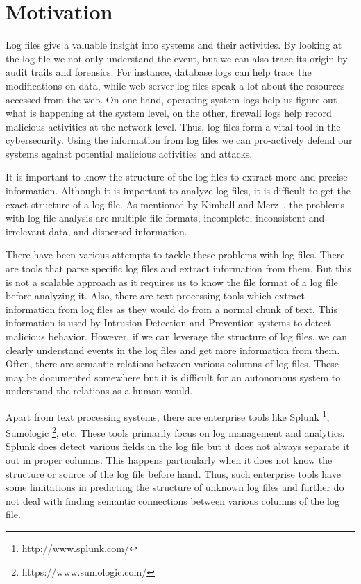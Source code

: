 \section{Motivation}

Log files give a valuable insight into systems and their activities. By looking at the log file we not only understand the event, but we can also trace its origin by audit trails and forensics. For instance, database logs can help trace the modifications on data, while web server log files speak a lot about the resources accessed from the web. On one hand, operating system logs help us figure out what is happening at the system level, on the other, firewall logs help record malicious activities at the network level. Thus, log files form a vital tool in the cybersecurity. Using the information from log files we can pro-actively defend our systems against potential malicious activities and attacks.

It is important to know the structure of the log files to extract more and precise information. Although it is important to analyze log files, it is difficult to get the exact structure of a log file. As mentioned by Kimball and Merz~\cite{kimball_log_problem}, the problems with log file analysis are multiple file formats, incomplete, inconsistent and irrelevant data, and dispersed information.

There have been various attempts to tackle these problems with log files. There are tools that parse specific log files and extract information from them. But this is not a scalable approach as it requires us to know the file format of a log file before analyzing it. Also, there are text processing tools which extract information from log files as they would do from a normal chunk of text. This information is used by Intrusion Detection and Prevention systems to detect malicious behavior. However, if we can leverage the structure of log files, we can clearly understand events in the log files and get more information from them. Often, there are semantic relations between various columns of log files. These may be documented somewhere but it is difficult for an autonomous system to understand the relations as a human would.

Apart from text processing systems, there are enterprise tools like Splunk \footnote{http://www.splunk.com/}, Sumologic \footnote{https://www.sumologic.com/}, etc. These tools primarily focus on log management and analytics. Splunk does detect various fields in the log file but it does not always separate it out in proper columns. This happens particularly when it does not know the structure or source of the log file before hand. Thus, such enterprise tools have some limitations in predicting the structure of unknown log files and further do not deal with finding semantic connections between various columns of the log file.


